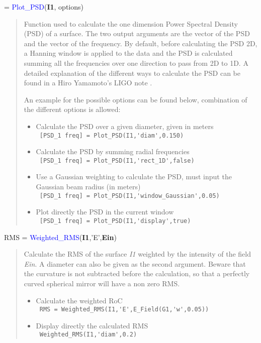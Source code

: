 \noindent {} = \textcolor{blue}{Plot\_PSD}(\textbf{I1}, options)
\vspace*{-0.2cm}
\begin{quote}
Function used to calculate the one dimension Power Spectral Density (PSD) of a surface. The two output arguments are the vector of the PSD and the vector of the frequency. By default, before calculating the PSD 2D, a Hanning window is applied to the data and the PSD is calculated summing all the frequencies over one direction to pass from 2D to 1D. A detailed explanation of the different ways to calculate the PSD can be found in a Hiro Yamamoto's LIGO note \cite{Hiro_PSD}.

An example for the possible options can be found below, combination of the different options is allowed:
\begin{itemize}
  \item Calculate the PSD over a given diameter, given in meters \\
        \verb? [PSD_1 freq] = Plot_PSD(I1,'diam',0.150) ?
  \item Calculate the PSD by summing radial frequencies \\
        \verb? [PSD_1 freq] = Plot_PSD(I1,'rect_1D',false) ?
  \item Use a Gaussian weighting to calculate the PSD, must input the Gaussian beam radius (in meters) \\
        \verb? [PSD_1 freq] = Plot_PSD(I1,'window_Gaussian',0.05) ?
  \item Plot directly the PSD in the current window \\
        \verb? [PSD_1 freq] = Plot_PSD(I1,'display',true) ?
\end{itemize}
\end{quote}


\noindent RMS = \textcolor{blue}{Weighted\_RMS}(\textbf{I1},'E',\textbf{Ein})
\vspace*{-0.2cm}
\begin{quote}
Calculate the RMS of the surface \textsl{I1} weighted by the intensity of the field \textsl{Ein}. A diameter can also be given as the second argument. Beware that the curvature is not subtracted before the calculation, so that a perfectly curved spherical mirror will have a non zero RMS.
\begin{itemize}
  \item Calculate the weighted RoC \\
        \verb? RMS = Weighted_RMS(I1,'E',E_Field(G1,'w',0.05)) ?
  \item Display directly the calculated RMS \\
        \verb? Weighted_RMS(I1,'diam',0.2) ?
\end{itemize}
\end{quote}


